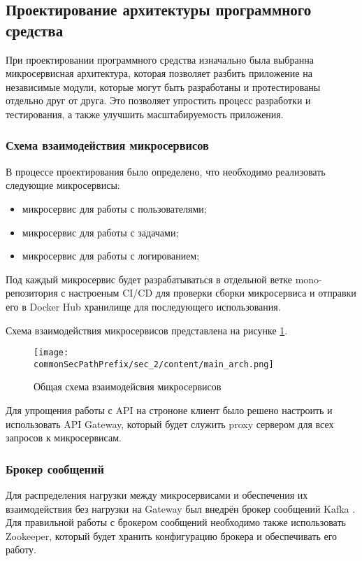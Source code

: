\subsection{Проектирование архитектуры программного средства}

При проектировании программного средства изначально была выбранна микросервисная архитектура, которая позволяет разбить приложение
на независимые модули, которые могут быть разработаны и протестированы отдельно друг от друга. 
Это позволяет упростить процесс разработки и тестирования, а также улучшить масштабируемость приложения.

\subsubsection{Схема взаимодействия микросервисов}

В процессе проектирования было определено, что необходимо реализовать следующие микросервисы:
\begin{itemize}
    \item микросервис для работы с пользователями;
    \item микросервис для работы с задачами;
    \item микросервис для работы с логированием;
\end{itemize}

Под каждый микросервис будет разрабатываться в отдельной ветке mono-репозитория с настроеным CI/CD для проверки сборки микросервиса
и отправки его в Docker Hub хранилище для последующего использования.

Схема взаимодействия микросервисов представлена на рисунке \ref{fig:main}.

\begin{figure}[ht]
    \centering
    \texttt{[image: \\commonSecPathPrefix/sec\_2/content/main\_arch.png]}
    \caption{Общая схема взаимодейсвия микросервисов}
    \label{fig:main}
\end{figure}

Для упрощения работы с API на строноне клиент было решено настроить и использовать API Gateway, который будет служить proxy сервером для
всех запросов к микросервисам.

\subsubsection{Брокер сообщений}

Для распределения нагрузки между микросервисами и обеспечения их взаимодействия без нагрузки на Gateway был внедрён брокер сообщений
Kafka \cite{kafkaDocs}. Для правильной работы с брокером сообщений необходимо также использовать Zookeeper, который будет хранить
конфигурацию брокера и обеспечивать его работу.

